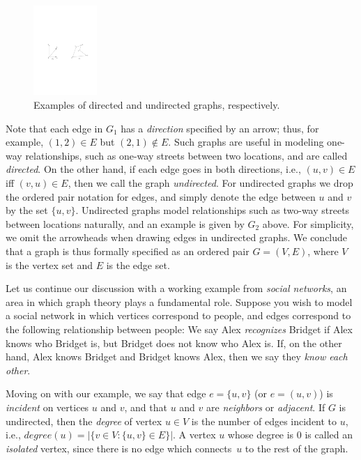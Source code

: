 \documentclass[11pt]{article}
\begin{document}
\begin{figure}[h]
\centering
\includegraphics[height=3.4cm]{graph1.pdf}
\caption{Examples of directed and undirected graphs, respectively.}
\end{figure}

Note that each edge in $G_1$ has a \emph{direction} specified by an arrow; thus, for example, $(1,2)\in E$ but $(2,1)\not\in E$. Such graphs are useful in modeling one-way relationships, such as one-way streets between two locations, and are called \emph{directed}. On the other hand, if each edge goes in both directions, i.e., $(u,v)\in E$ iff $(v,u)\in E$, then we call the graph \emph{undirected}.
For undirected graphs we drop the ordered pair notation for edges, and simply denote the edge between $u$ and $v$ by the set $\{u,v\}$.
Undirected graphs model relationships such as two-way streets between locations naturally, and an example is given by $G_2$ above. For simplicity, we omit the arrowheads when drawing edges in undirected graphs. We conclude that a graph is thus formally specified as an ordered pair $G=(V,E)$, where $V$ is the vertex set and $E$ is the edge set.


Let us continue our discussion with a working example from \emph{social networks}, an area in which graph theory plays a fundamental role. Suppose you wish to model a social network in which vertices correspond to people, and edges correspond to the following relationship between people: We say Alex \emph{recognizes} Bridget if Alex knows who Bridget is, but Bridget does not know who Alex is. If, on the other hand, Alex knows Bridget and Bridget knows Alex, then we say they \emph{know each other}.


Moving on with our example, we say that edge $e = \{u,v\}$ (or $e=(u,v)$) is {\it incident\/} on vertices $u$ and $v$, and that $u$ and $v$ are {\it neighbors\/} or {\it adjacent\/}. If $G$ is undirected, then the {\it degree\/} of vertex $u \in V$ is the number of edges incident to $u$, i.e.,
$degree(u)=|\{v \in V: \{u,v\} \in E\}|$. A vertex $u$ whose degree is $0$ is called an
{\it isolated\/} vertex, since there is no edge which
connects~$u$ to the rest of the graph.
\end{document}

